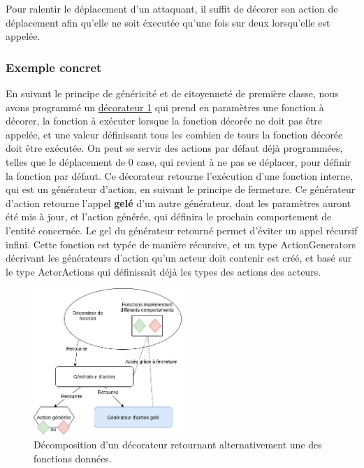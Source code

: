 \documentclass{article}
\begin{document}
Pour ralentir le déplacement d'un attaquant, il suffit de décorer son action de déplacement afin qu'elle ne soit éxecutée qu'une fois sur deux lorsqu'elle est appelée.

\subsubsection{Exemple concret}

En suivant le principe de généricité et de citoyenneté de première classe, nous avons programmé un \hyperref[fig:deco_every_n]{décorateur \ref{fig:deco_every_n}} qui prend en paramètres une fonction à décorer, la fonction à exécuter lorsque la fonction décorée ne doit pas être appelée, et une valeur définissant tous les combien de tours la fonction décorée doit être exécutée. On peut se servir des actions par défaut déjà programmées, telles que le déplacement de 0 case, qui revient à ne pas se déplacer, pour définir la fonction par défaut.
Ce décorateur retourne l'exécution d'une fonction interne, qui est un générateur d'action, en suivant le principe de fermeture. Ce générateur d'action retourne l'appel \textbf{gelé} d'un autre générateur, dont les paramètres auront été mis à jour, et l'action générée, qui définira le prochain comportement de l'entité concernée. Le gel du générateur retourné permet d'éviter un appel récursif infini. Cette fonction est typée de manière récursive, et un type ActionGenerators décrivant les générateurs d'action qu'un acteur doit contenir est créé, et basé sur le type ActorActions qui définissait déjà les types des actions des acteurs.

\begin{figure}[H]
    \centering
    \includegraphics[width = 0.5\textwidth]{diag_deco_every_n.png}
    \caption{Décomposition d'un décorateur retournant alternativement une des fonctions données.}
    \label{fig:deco_every_n}
\end{figure}
\end{document}
